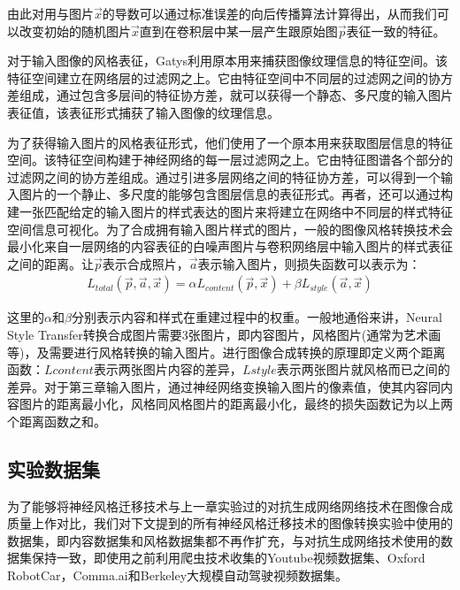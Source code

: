 由此对用与图片$\vec{x}$的导数可以通过标准误差的向后传播算法计算得出，从而我们可以改变初始的随机图片$\vec{x}$直到在卷积层中某一层产生跟原始图$\vec{p}$表征一致的特征。

对于输入图像的风格表征，Gatys利用原本用来捕获图像纹理信息的特征空间。该特征空间建立在网络层的过滤网之上。它由特征空间中不同层的过滤网之间的协方差组成，通过包含多层间的特征协方差，就可以获得一个静态、多尺度的输入图片表征值，该表征形式捕获了输入图像的纹理信息。 

为了获得输入图片的风格表征形式，他们使用了一个原本用来获取图层信息的特征空间。该特征空间构建于神经网络的每一层过滤网之上。它由特征图谱各个部分的过滤网之间的协方差组成。通过引进多层网络之间的特征协方差，可以得到一个输入图片的一个静止、多尺度的能够包含图层信息的表征形式。再者，还可以通过构建一张匹配给定的输入图片的样式表达的图片来将建立在网络中不同层的样式特征空间信息可视化。为了合成拥有输入图片样式的图片，一般的图像风格转换技术会最小化来自一层网络的内容表征的白噪声图片与卷积网络层中输入图片的样式表征之间的距离。让$\overrightarrow{p}$表示合成照片，$\overrightarrow{a}$表示输入图片，则损失函数可以表示为：
\begin{align}
    L_{total}(\overrightarrow{p},\overrightarrow{a}, \overrightarrow{x})=
    \alpha L_{content}(\overrightarrow{p}, \overrightarrow{x}) +
    \beta L_{style}(\overrightarrow{a}, \overrightarrow{x})
\end{align}

这里的$\alpha$和$\beta$分别表示内容和样式在重建过程中的权重。一般地通俗来讲，Neural Style Transfer转换合成图片需要3张图片，即内容图片，风格图片(通常为艺术画等)，及需要进行风格转换的输入图片。进行图像合成转换的原理即定义两个距离函数：$Lcontent$表示两张图片内容的差异，$Lstyle$表示两张图片就风格而已之间的差异。对于第三章输入图片，通过神经网络变换输入图片的像素值，使其内容同内容图片的距离最小化，风格同风格图片的距离最小化，最终的损失函数记为以上两个距离函数之和。 

\subsection{实验数据集}

为了能够将神经风格迁移技术与上一章实验过的对抗生成网络网络技术在图像合成质量上作对比，我们对下文提到的所有神经风格迁移技术的图像转换实验中使用的数据集，即内容数据集和风格数据集都不再作扩充，与对抗生成网络技术使用的数据集保持一致，即使用之前利用爬虫技术收集的Youtube视频数据集、Oxford RobotCar\cite{ds:oxford}，Comma.ai\cite{ds:ai}和Berkeley大规模自动驾驶视频数据集\cite{ds:berkeley}。

